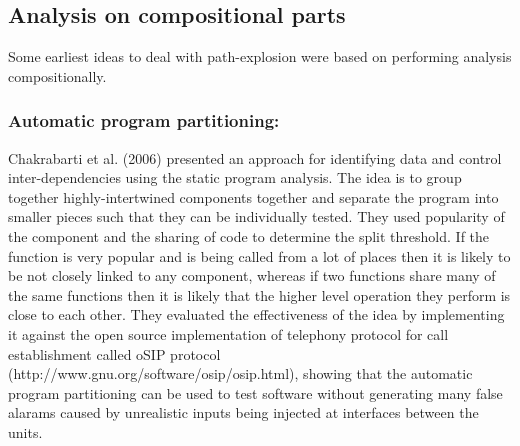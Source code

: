 \documentclass[ runningheads,
               a4paper]{llncs}
\begin{document}


\subsection{Analysis on compositional parts}
Some earliest ideas to deal with path-explosion were based on performing analysis compositionally.


\subsubsection{Automatic program partitioning:}
Chakrabarti et al. (2006) \cite{chakrabarti2006software} presented an approach for identifying data and control inter-dependencies using the static program analysis. The idea is to group together highly-intertwined components together and separate the program into smaller pieces such that they can be individually tested. They used popularity of the component and the sharing of code to determine the split threshold. If the function is very popular and is being called from a lot of places then it is likely to be not closely linked to any component, whereas if two functions share many of the same functions then it is likely that the higher level operation they perform is close to each other. They evaluated the effectiveness of the idea by implementing it against the open source implementation of telephony protocol for call establishment called oSIP protocol (http://www.gnu.org/software/osip/osip.html), showing that the automatic program partitioning can be used to test software without generating many false alarams caused by unrealistic inputs being injected at interfaces between the units.
\end{document}
